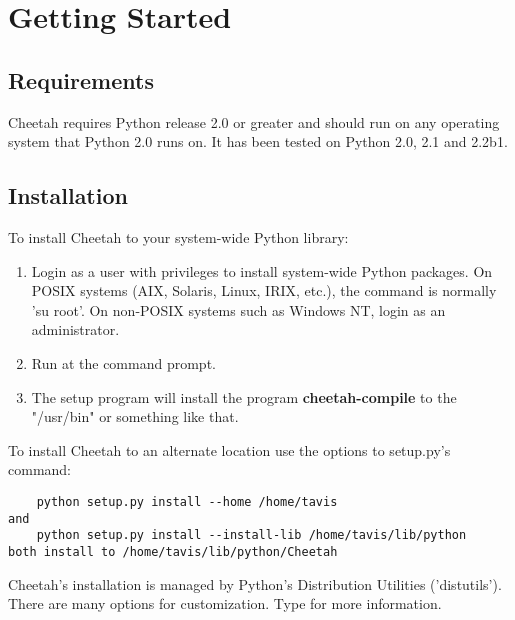 \section{Getting Started}
\label{gettingStarted}

\subsection{Requirements}
\label{gettingStarted.requirements}

Cheetah requires Python release 2.0 or greater and should run on any
operating system that Python 2.0 runs on.  It has been tested on
Python 2.0, 2.1 and 2.2b1.

\subsection{Installation}
\label{gettingStarted.install}

To install Cheetah to your system-wide Python library:
\begin{enumerate}
\item Login as a user with privileges to install system-wide Python packages.
     On POSIX systems (AIX, Solaris, Linux, IRIX, etc.), the command is normally
     'su root'.  On non-POSIX systems such as Windows NT, login as an
     administrator.

\item Run  at the command prompt.

\item The setup program will install the program {\bf cheetah-compile} to the
     "/usr/bin" or something like that.
\end{enumerate}


To install Cheetah to an alternate location use the options to setup.py's
 command:
\begin{verbatim}
    python setup.py install --home /home/tavis 
and
    python setup.py install --install-lib /home/tavis/lib/python
both install to /home/tavis/lib/python/Cheetah
\end{verbatim}

Cheetah's installation is managed by Python's Distribution Utilities
('distutils').  There are many options for customization.  Type  for more information.

